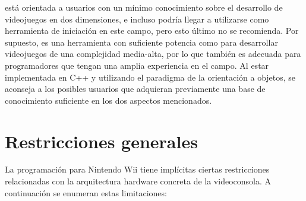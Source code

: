  está orientada a usuarios con un mínimo conocimiento sobre el desarrollo de videojuegos en dos dimensiones, e incluso podría llegar a utilizarse como herramienta de iniciación en este campo, pero esto último no se recomienda. Por supuesto, es una herramienta con suficiente potencia como para desarrollar videojuegos de una complejidad media-alta, por lo que también es adecuada para programadores que tengan una amplia experiencia en el campo. Al estar implementada en C++ y utilizando el paradigma de la orientación a objetos, se aconseja a los posibles usuarios que adquieran previamente una base de conocimiento suficiente en los dos aspectos mencionados.

\section{Restricciones generales}

La programación para Nintendo Wii tiene implícitas ciertas restricciones relacionadas con la arquitectura hardware concreta de la videoconsola. A continuación se enumeran estas limitaciones:


